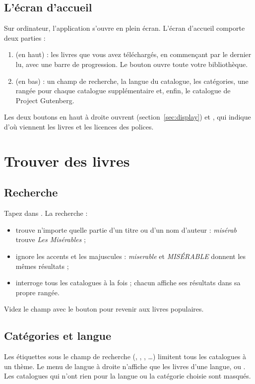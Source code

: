 \documentclass[11pt]{article}
\begin{document}
\subsection{L’écran d’accueil}
Sur ordinateur, l’application s’ouvre en plein écran. L’écran d’accueil comporte deux parties :

\begin{enumerate}
  \item {} (en haut) : les livres que vous avez téléchargés, en commençant
        par le dernier lu, avec une barre de progression. Le bouton 
        ouvre toute votre bibliothèque.
  \item {} (en bas) : un champ de recherche, la langue du
        catalogue, les catégories, une rangée pour chaque catalogue supplémentaire et, enfin, le
        catalogue de Project Gutenberg.
\end{enumerate}


Les deux boutons en haut à droite ouvrent 
(section~\ref{sec:display}) et , qui indique d’où viennent les livres et les licences
des polices.

\section{Trouver des livres}

\subsection{Recherche}
Tapez dans . La recherche :
\begin{itemize}
  \item trouve n’importe quelle partie d’un titre ou d’un nom d’auteur : \emph{misérab} trouve
        \emph{Les Misérables} ;
  \item ignore les accents et les majuscules : \emph{miserable} et \emph{MISÉRABLE} donnent les
        mêmes résultats ;
  \item interroge tous les catalogues à la fois ; chacun affiche ses résultats dans sa propre
        rangée.
\end{itemize}
Videz le champ avec le bouton  pour revenir aux livres populaires.

\subsection{Catégories et langue}
Les étiquettes sous le champ de recherche (, , ,
…) limitent tous les catalogues à un thème. Le menu de langue à droite n’affiche que les
livres d’une langue, ou . Les catalogues qui n’ont rien pour la langue ou la
catégorie choisie sont masqués.
\end{document}
